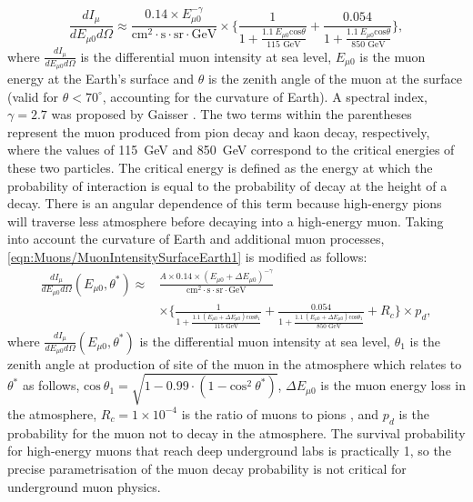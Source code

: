 \begin{equation}
    \label{eqn:Muons/MuonIntensitySurfaceEarth1}
    \frac{dI_\mu}{dE_{\mu0}d\Omega}\approx\frac{0.14\times E^{-\gamma}_{\mu0}}{\text{cm}^2\cdot\text{s}\cdot\text{sr}\cdot\text{GeV}}\times\Biggl\{\frac{1}{1+\frac{1.1\:E_{\mu0}\text{cos}\theta}{115\text{ GeV}}}+\frac{0.054}{1+\frac{1.1\:E_{\mu0}\text{cos}\theta}{850\text{ GeV}}}\Biggl\},
\end{equation}
where $\frac{dI_\mu}{dE_{\mu0}d\Omega}$ is the differential muon intensity at sea level, $E_{\mu0}$ is the muon energy at the Earth's surface and $\theta$ is the zenith angle of the muon at the surface (valid for $\theta<70^\circ$, accounting for the curvature of Earth). A spectral index, $\gamma=2.7$ was proposed by Gaisser \cite{Gaisser_Engel_Resconi_2016}. The two terms within the parentheses represent the muon produced from pion decay and kaon decay, respectively, where the values of 115~GeV and 850~GeV correspond to the critical energies of these two particles. The critical energy is defined as the energy at which the probability of interaction is equal to the probability of decay at the height of a decay. There is an angular dependence of this term because high-energy pions will traverse less atmosphere before decaying into a high-energy muon.
Taking into account the curvature of Earth and additional muon processes, \autoref{eqn:Muons/MuonIntensitySurfaceEarth1} is modified as follows:
\begin{equation}
\label{eqn:Muons/MuonIntensitySurfaceEarth2}
\begin{split}    
    \frac{dI_\mu}{dE_{\mu0}d\Omega}(E_{\mu0},\theta^*)\approx&\frac{A\times 0.14\times (E_{\mu0}+\Delta E_{\mu0})^{-\gamma}}{\text{cm}^2\cdot\text{s}\cdot\text{sr}\cdot\text{GeV}}\\
    &\times\Biggl\{\frac{1}{1+\frac{1.1\:(E_{\mu0}+\Delta E_{\mu0})\text{cos}\theta_1}{115\text{ GeV}}}+\frac{0.054}{1+\frac{1.1\:(E_{\mu0}+\Delta E_{\mu0})\text{cos}\theta_1}{850\text{ GeV}}}+R_c\Biggl\}\times p_d,
\end{split}
\end{equation}
where $\frac{dI_\mu}{dE_{\mu0}d\Omega}(E_{\mu0},\theta^*)$ is the differential muon intensity at sea level, $\theta_1$ is the zenith angle at production of site of the muon in the atmosphere which relates to $\theta^*$ as follows, $\text{cos}\:\theta_1=\sqrt{1-0.99\cdot(1-\text{cos}^2\:\theta^*)}$, $\Delta E_{\mu0}$ is the muon energy loss in the atmosphere, $R_c=1\times10^{-4}$ is the ratio of muons to pions \cite{LVD:1998lir}, and $p_d$ is the probability for the muon not to decay in the atmosphere. The survival probability for high-energy muons that reach deep underground labs is practically 1, so the precise parametrisation of the muon decay probability is not critical for underground muon physics.

